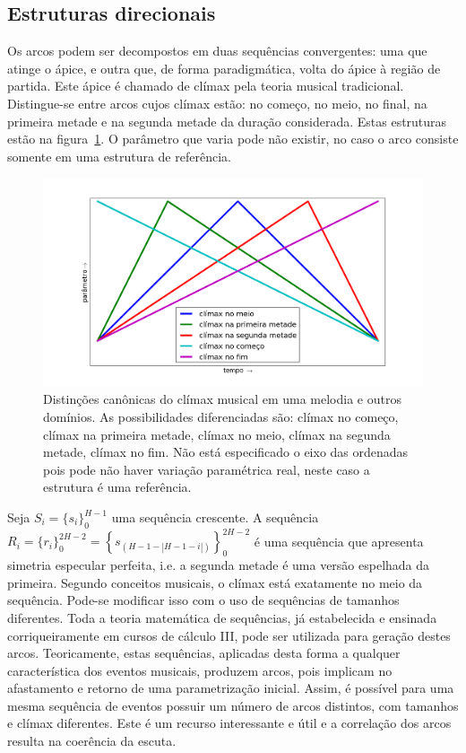 \subsection{Estruturas direcionais}\label{subsec:dir}


Os arcos podem ser decompostos em duas sequências convergentes: 
uma que atinge o ápice, e 
outra que, de forma paradigmática, volta do ápice à região de partida. Este ápice é chamado de clímax pela teoria musical tradicional. Distingue-se entre arcos cujos clímax estão: no começo, no meio, no final, na primeira metade e na segunda metade da duração considerada. Estas estruturas estão na figura~\ref{fig:climax}. O parâmetro que varia pode não existir, no caso o arco consiste somente em uma estrutura de referência.\cite{Schoenberg}

\begin{figure}[h!]
    \centering
        \includegraphics[width=\textwidth]{figuras/climax}
    \caption{Distinções canônicas do clímax musical em uma melodia e outros domínios. As possibilidades diferenciadas são: clímax no começo, clímax na primeira metade, clímax no meio, clímax na segunda metade, clímax no fim. Não está especificado o eixo das ordenadas pois pode não haver variação paramétrica real, neste caso a estrutura é uma referência.}
        \label{fig:climax}
\end{figure}


Seja $S_i=\{s_i\}_0^{H-1}$ uma sequência crescente. A sequência 
$R_i=\{r_i\}_0^{2H -2}=\left\{s_{(H-1-|H-1-i|)}\right\}_0^{2H-2}$ 
é uma sequência que apresenta simetria especular perfeita, i.e. a segunda metade é uma versão espelhada da primeira. Segundo conceitos musicais, o clímax está exatamente no meio da sequência. Pode-se modificar isso com o uso de sequências de tamanhos diferentes. Toda a teoria matemática de sequências, já estabelecida e ensinada corriqueiramente em cursos de cálculo III, pode ser utilizada para geração destes arcos.\cite{Guidorizzo,Schoenberg} 
Teoricamente, estas sequências, aplicadas desta forma
a qualquer característica dos eventos musicais, produzem arcos,
pois implicam no afastamento e retorno de uma parametrização inicial. 
Assim, é possível para uma mesma sequência de eventos possuir um número de arcos distintos, com tamanhos e clímax diferentes. Este é um recurso
interessante e útil e a correlação dos arcos resulta na coerência da escuta.\cite{Salzer}

